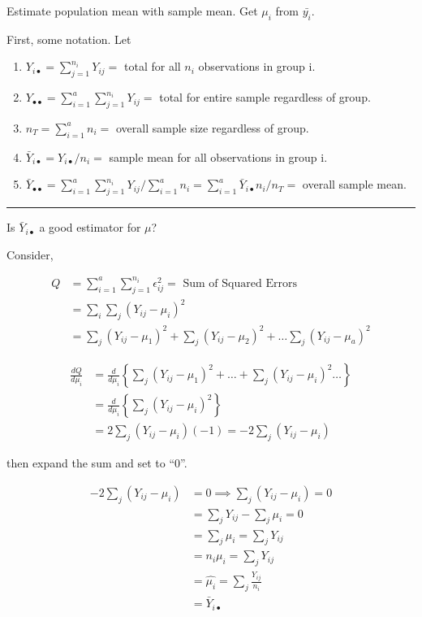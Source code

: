 \documentclass[10pt]{article}
\newcommand{\mean}[1]{\mu_{#1}}
\newcommand{\err}[1]{\epsilon_{#1}}
\newcommand{\drawline}{\noindent\rule{\linewidth}{0.1pt}}
\begin{document}
\begin{multicols}{3}
    Estimate population mean with sample mean. Get $\mean{i}$ from $\bar{y_{i}}$.

    First, some notation. Let

    \begin{enumerate}
        \item $Y_{i\bullet} = \sum_{j=1}^{n_i} Y_{ij}=$ total for all $n_i$ observations in group i.
        \item $Y_{\bullet\bullet} = \sum_{i=1}^{a} \sum_{j=1}^{n_i} Y_{ij}=$ total for entire sample regardless of group.
        \item $n_{T} = \sum_{i=1}^a n_i =$ overall sample size regardless of group.
        \item $\bar Y_{i\bullet} = Y_{i\bullet}/n_i=$ sample mean for all observations in group i.
        \item $\bar Y_{\bullet\bullet} = \sum_{i=1}^a \sum_{j=1}^{n_i} Y_{ij}/\sum_{i=1}^a n_i = \sum_{i=1}^a \bar Y_{i\bullet} n_i / n_T =$  overall sample mean.
    \end{enumerate}

    \drawline

    Is $\bar Y_{i\bullet}$ a good estimator for $\mu$?

    Consider,

    \begin{align*}
        Q & = \sum_{i=1}^a \sum_{j=1}^{n_i} \err{ij}^2 = \text{ Sum of Squared Errors} \\
            & = \sum_i \sum_j (Y_{ij} - \mean{i})^2 \\
            & = \sum_j (Y_{ij} - \mean{1})^2 + \sum_j (Y_{ij} - \mean{2})^2  + \dots \sum_j (Y_{ij} - \mean{a})^2 
    \end{align*}

    \begin{align*}
        \frac{dQ}{d\mean{i}} & = \frac{d}{d\mean{i}} \left\{\sum_j (Y_{ij} - \mean{1})^2 +\dots+ \sum_j (Y_{ij} - \mean{i})^2  \dots \right\} \\
            & = \frac{d}{d\mean{i}} \left\{\sum_j (Y_{ij} - \mean{i})^2 \right\} \\
            & = 2\sum_j (Y_{ij} - \mean{i}) (-1) = -2 \sum_j (Y_{ij} - \mean{i})     
    \end{align*}

    then expand the sum and set to ``0''.

    \begin{align*}
        -2 \sum_j (Y_{ij} - \mean{i})  & = 0 \implies \sum_j (Y_{ij} - \mean{i}) = 0 \\
            & = \sum_j{Y_{ij}} - \sum_j{\mean{i}} = 0 \\
            & = \sum_j \mean{i} = \sum_j Y_{ij} \\
            & = n_i \mean{i} = \sum_j Y_{ij} \\
            & = \hat{\mean{i}} = \sum_j \frac{Y_{ij}}{n_i} \\
            & = \bar Y_{i\bullet}
    \end{align*}


\end{multicols}
\end{document}
